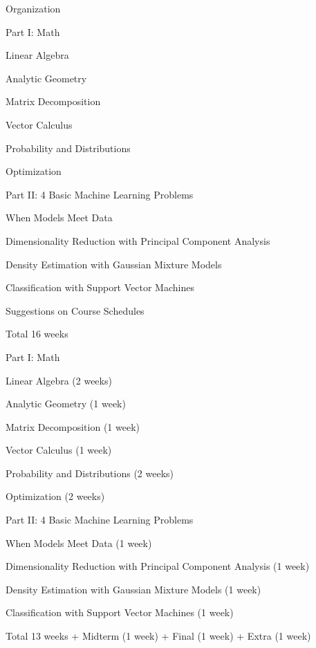 \documentclass[handout,fleqn,aspectratio=169]{beamer}
\begin{document}
\begin{frame}{Organization}

\plitemsep 0.03in

\bci 
\item Part I: Math 
\bce
\item Linear Algebra
\item Analytic Geometry
\item  Matrix Decomposition
\item Vector Calculus
\item Probability and Distributions
\item Optimization
\ece

\medskip
\item Part II: 4 Basic Machine Learning Problems
\bce
\item When Models Meet Data

\item Dimensionality Reduction with Principal Component Analysis

\item Density Estimation with Gaussian Mixture Models

\item Classification with Support Vector Machines
\ece

\eci
\end{frame}

\begin{frame}{Suggestions on Course Schedules}

Total 16 weeks
\vspace{-0.2cm}
\plitemsep 0.01in

\bci 
\item Part I: Math 
\bce
\item Linear Algebra \hfill (2 weeks)
\item Analytic Geometry \hfill (1 week)
\item  Matrix Decomposition \hfill(1 week)
\item Vector Calculus \hfill(1 week)
\item Probability and Distributions \hfill(2 weeks)
\item Optimization \hfill(2 weeks)
\ece

\item Part II: 4 Basic Machine Learning Problems
\bce
\item When Models Meet Data \hfill(1 week)

\item Dimensionality Reduction with Principal Component Analysis \hfill(1 week)

\item Density Estimation with Gaussian Mixture Models \hfill(1 week)

\item Classification with Support Vector Machines \hfill(1 week)
\ece

\item Total 13 weeks + Midterm (1 week) + Final (1 week) + Extra (1 week)
\eci
\end{frame}
\end{document}
